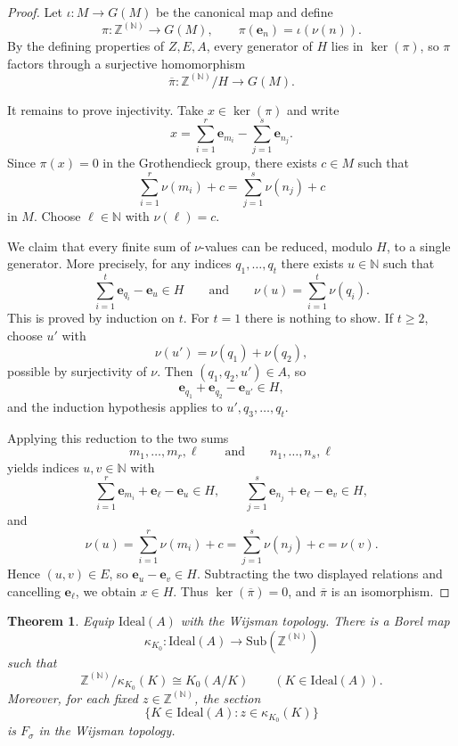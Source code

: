 \documentclass[12pt,fleqn,a4paper]{amsart}
\renewcommand{\ge}{\geqslant}
\numberwithin{equation}{section}
\newtheorem{theorem}{Theorem}[section]
\theoremstyle{definition}
\newcommand{\N}{\mathbb{N}}
\newcommand{\Z}{\mathbb{Z}}
\newcommand{\Ideal}{\mathrm{Ideal}}
\newcommand{\Sub}{\mathrm{Sub}}
\begin{document}
\begin{proof}
Let $\iota:M\to G(M)$ be the canonical map and define
\[
\pi:\Z^{(\N)}\to G(M),\qquad \pi(\mathbf e_n)=\iota(\nu(n)).
\]
By the defining properties of $Z,E,A$, every generator of $H$ lies in $\ker(\pi)$,
so $\pi$ factors through a surjective homomorphism
\[
\overline\pi:\Z^{(\N)}/H\to G(M).
\]

It remains to prove injectivity.
Take $x\in\ker(\pi)$ and write
\[
x=\sum_{i=1}^r \mathbf e_{m_i}-\sum_{j=1}^s \mathbf e_{n_j}.
\]
Since $\pi(x)=0$ in the Grothendieck group, there exists $c\in M$ such that
\[
\sum_{i=1}^r \nu(m_i)+c=\sum_{j=1}^s \nu(n_j)+c
\]
in $M$.  Choose $\ell\in\N$ with $\nu(\ell)=c$.

We claim that every finite sum of $\nu$-values can be reduced, modulo $H$, to a
single generator.  More precisely, for any indices $q_1,\dots,q_t$ there exists
$u\in\N$ such that
\[
\sum_{i=1}^t \mathbf e_{q_i}-\mathbf e_u\in H
\qquad\text{and}\qquad
\nu(u)=\sum_{i=1}^t \nu(q_i).
\]
This is proved by induction on $t$.
For $t=1$ there is nothing to show.
If $t\ge 2$, choose $u'$ with
\[
\nu(u')=\nu(q_1)+\nu(q_2),
\]
possible by surjectivity of $\nu$.
Then $(q_1,q_2,u')\in A$, so
\[
\mathbf e_{q_1}+\mathbf e_{q_2}-\mathbf e_{u'}\in H,
\]
and the induction hypothesis applies to $u',q_3,\dots,q_t$.

Applying this reduction to the two sums
\[
m_1,\dots,m_r,\ell
\qquad\text{and}\qquad
n_1,\dots,n_s,\ell
\]
yields indices $u,v\in\N$ with
\[
\sum_{i=1}^r \mathbf e_{m_i}+\mathbf e_\ell-\mathbf e_u\in H,
\qquad
\sum_{j=1}^s \mathbf e_{n_j}+\mathbf e_\ell-\mathbf e_v\in H,
\]
and
\[
\nu(u)=\sum_{i=1}^r \nu(m_i)+c=\sum_{j=1}^s \nu(n_j)+c=\nu(v).
\]
Hence $(u,v)\in E$, so $\mathbf e_u-\mathbf e_v\in H$.
Subtracting the two displayed relations and cancelling $\mathbf e_\ell$, we obtain
$x\in H$.
Thus $\ker(\overline\pi)=0$, and $\overline\pi$ is an isomorphism.
\end{proof}

\begin{theorem}\label{thm:K0}
Equip $\Ideal(A)$ with the Wijsman topology.  There is a Borel map
\[
\kappa_{K_0}:\Ideal(A)\to\Sub(\Z^{(\N)})
\]
such that
\[
\Z^{(\N)}/\kappa_{K_0}(K)\cong K_0(A/K)
\qquad (K\in\Ideal(A)).
\]
Moreover, for each fixed $z\in\Z^{(\N)}$, the section
\[
\{K\in\Ideal(A): z\in \kappa_{K_0}(K)\}
\]
is $F_\sigma$ in the Wijsman topology.
\end{theorem}
\end{document}
